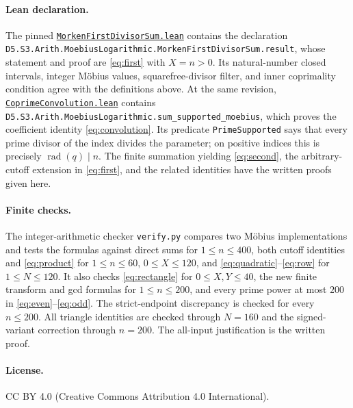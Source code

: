 \documentclass[11pt]{article}
\newcommand{\rad}{\operatorname{rad}}
\begin{document}
\paragraph{Lean declaration.}
The pinned
\href{https://github.com/the-omega-institute/trureturing/blob/4a11a6467d4ba3682c7630cd22c551cd11074cc6/D5/S3/Arith/MoebiusLogarithmic/MorkenFirstDivisorSum.lean}{\texttt{MorkenFirstDivisorSum.lean}}
contains the declaration
\nolinkurl{D5.S3.Arith.MoebiusLogarithmic.MorkenFirstDivisorSum.result},
whose statement and proof are
\eqref{eq:first} with $X=n>0$.
Its natural-number closed intervals, integer M\"obius values,
squarefree-divisor filter, and inner coprimality condition agree with the
definitions above. At the same revision,
\href{https://github.com/the-omega-institute/trureturing/blob/4a11a6467d4ba3682c7630cd22c551cd11074cc6/D5/S3/Arith/MoebiusLogarithmic/CoprimeConvolution.lean}{\texttt{CoprimeConvolution.lean}}
contains
\nolinkurl{D5.S3.Arith.MoebiusLogarithmic.sum_supported_moebius},
which proves the coefficient identity
\eqref{eq:convolution}. Its predicate \texttt{PrimeSupported} says that
every prime divisor of the index divides the parameter; on positive
indices this is precisely $\rad(q)\mid n$.
The finite summation yielding \eqref{eq:second}, the arbitrary-cutoff
extension in \eqref{eq:first}, and the related identities have the written
proofs given here.

\paragraph{Finite checks.}
The integer-arithmetic checker \texttt{verify.py} compares two
M\"obius implementations and tests the formulas against direct sums for
$1\leq n\leq400$, both cutoff identities and \eqref{eq:product} for
$1\leq n\leq60$, $0\leq X\leq120$, and
\eqref{eq:quadratic}--\eqref{eq:row} for $1\leq N\leq120$.
It also checks \eqref{eq:rectangle} for $0\leq X,Y\leq40$,
the new finite transform and gcd formulas for $1\leq n\leq200$,
and every prime power at most $200$ in \eqref{eq:even}--\eqref{eq:odd}.
The strict-endpoint discrepancy is checked for every $n\leq200$.
All triangle identities are checked through $N=160$ and the
signed-variant correction through $n=200$.
The all-input justification is the written proof.

\paragraph{License.} CC BY 4.0 (Creative Commons Attribution 4.0 International).
\end{document}
